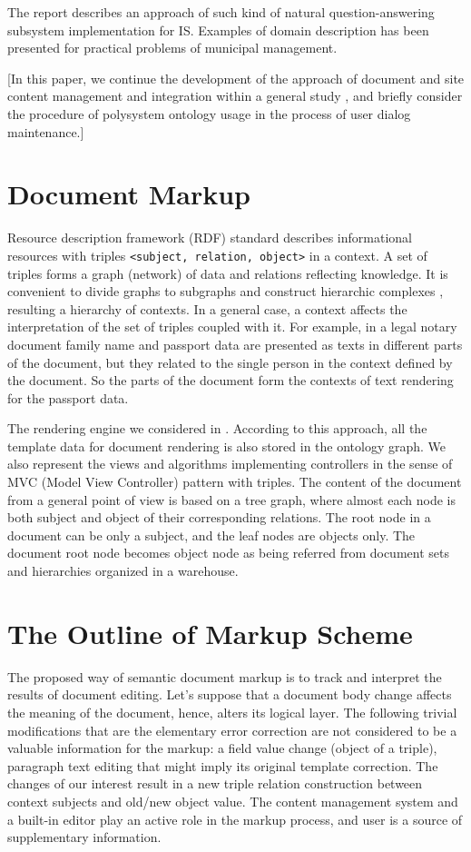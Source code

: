 \documentclass[conference]{IEEEtran}
\newcommand{\e}[2][fcolor]{\textcolor{pcolor}{[}\textcolor{#1}{#2}\textcolor{pcolor}{]}}
\begin{document}
The report describes an approach of such kind of natural question-answering subsystem implementation for IS.  Examples of domain description has been presented for practical problems of municipal management.

\e{In this paper, we continue the development of the approach
\cite{prevwork} of document and site content management and
integration within a general study \cite{b2:15}, and briefly consider
the procedure of polysystem ontology usage in the process of user
dialog maintenance.}

\section{Document Markup}

Resource description framework (RDF) standard describes informational
resources with triples \texttt{<subject, relation, object>} in a
context.  A set of triples forms a graph (network) of data and
relations reflecting knowledge.  It is convenient to divide graphs to
subgraphs and construct hierarchic complexes \cite{b2:15}, resulting a
hierarchy of contexts.  In a general case, a context affects the
interpretation of the set of triples coupled with it.  For example, in
a legal notary document family name and passport data are presented as
texts in different parts of the document, but they related to the
single person in the context defined by the document.  So the parts of
the document form the contexts of text rendering for the passport
data.

The rendering engine we considered in \cite{prevwork}.  According to this approach, all the template data for document rendering is also stored in the ontology graph.  We also represent the views and algorithms implementing controllers in the sense of MVC (Model View Controller) \cite{b2:5} pattern with triples.  The content of the document from a general point of view is based on a tree graph, where almost each node is both subject and object of their corresponding relations.  The root node in a document can be only a subject, and the leaf nodes are objects only.  The document root node becomes object node as being referred from document sets and hierarchies organized in a warehouse.

\section{The Outline of Markup Scheme}
\label{sec:scheme}

The proposed way of semantic document markup is to track and interpret the results of document editing.  Let's suppose that a document body change affects the meaning of the document, hence, alters its logical layer.  The following trivial modifications that are the elementary error correction are not considered to be a valuable information for the markup: a field value change (object of a triple), paragraph text editing that might imply its original template correction.  The changes of our interest result in a new triple relation construction between context subjects and old/new object value.  The content management system and a built-in editor play an active role in the markup process, and user is a source of supplementary information.
\end{document}
